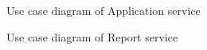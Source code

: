 \documentclass[12pt]{article}
\begin{document}
\begin{figure}[H]
\centering	
{}
\caption{Use case diagram of Application service}
\end{figure}

\begin{figure}[H]
\centering	
{}
\caption{Use case diagram of Report service}
\end{figure}
\end{document}
